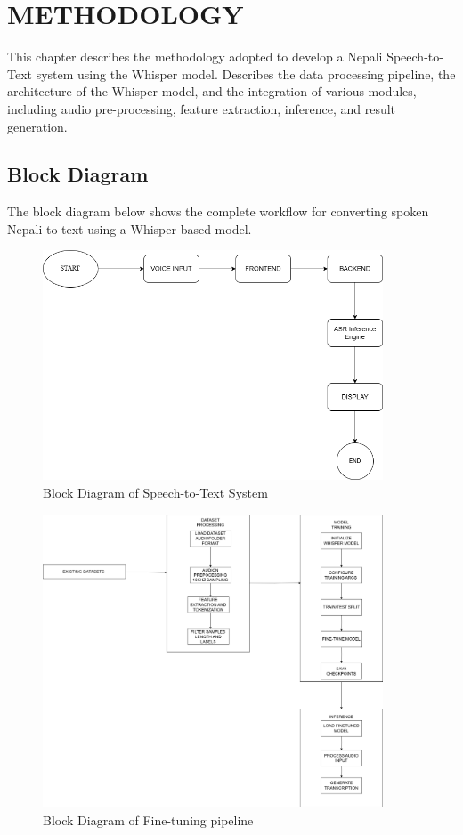 \chapter{METHODOLOGY}
This chapter describes the methodology adopted to develop a Nepali Speech-to-Text system using the Whisper model. Describes the data processing pipeline, the architecture of the Whisper model, and the integration of various modules, including audio pre-processing, feature extraction, inference, and result generation.

\section{Block Diagram}
The block diagram below shows the complete workflow for converting spoken Nepali to text using a Whisper-based model.

\begin{figure}[H]
	\centering
	\includegraphics[width=0.90\textwidth]{"Images/deep.png"}
	\caption{Block Diagram of Speech-to-Text System}
	\label{fig:BlockDiagram}
\end{figure}
\begin{figure}[H]
	\centering
	\includegraphics[width=0.90\textwidth]{"Images/finenew.png"}
	\caption{Block Diagram of Fine-tuning pipeline}
	\label{fig: BlockDiagram for Fine-tuning pipeline}
\end{figure}

